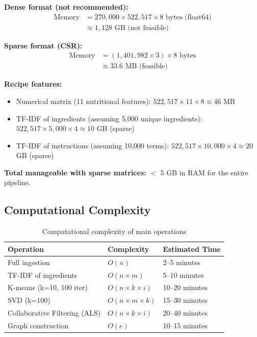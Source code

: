 \documentclass[11pt,a4paper]{article}
\begin{document}
\textbf{Dense format (not recommended):}
\begin{align*}
\text{Memory} &= 270,000 \times 522,517 \times 8 \text{ bytes (float64)} \\
&\approx 1,128 \text{ GB (not feasible)}
\end{align*}

\textbf{Sparse format (CSR):}
\begin{align*}
\text{Memory} &= (1,401,982 \times 3) \times 8 \text{ bytes} \\
&\approx 33.6 \text{ MB (feasible)}
\end{align*}

\textbf{Recipe features:}
\begin{itemize}
    \item Numerical matrix (11 nutritional features): $522,517 \times 11 \times 8 \approx 46$ MB
    \item TF-IDF of ingredients (assuming 5,000 unique ingredients): $522,517 \times 5,000 \times 4 \approx 10$ GB (sparse)
    \item TF-IDF of instructions (assuming 10,000 terms): $522,517 \times 10,000 \times 4 \approx 20$ GB (sparse)
\end{itemize}

\textbf{Total manageable with sparse matrices:} $<$ 5 GB in RAM for the entire pipeline.

\subsection{Computational Complexity}

\begin{table}[H]
\centering
\begin{tabular}{lll}
\toprule
\textbf{Operation} & \textbf{Complexity} & \textbf{Estimated Time} \\
\midrule
Full ingestion & $O(n)$ & 2--5 minutes \\
TF-IDF of ingredients & $O(n \times m)$ & 5--10 minutes \\
K-means (k=10, 100 iter) & $O(n \times k \times i)$ & 10--20 minutes \\
SVD (k=100) & $O(n \times m \times k)$ & 15--30 minutes \\
Collaborative Filtering (ALS) & $O(n \times k \times i)$ & 20--40 minutes \\
Graph construction & $O(e)$ & 10--15 minutes \\
\bottomrule
\end{tabular}
\caption{Computational complexity of main operations}
\label{tab:complexity}
\end{table}
\end{document}
